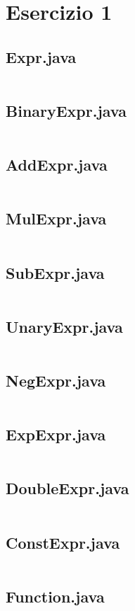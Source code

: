 \section*{Esercizio 1}

\subsection*{Expr.java}
\inputminted{java}{tex/src/1/Expr.java}

\subsection*{BinaryExpr.java}
\inputminted{java}{tex/src/1/BinaryExpr.java}

\subsection*{AddExpr.java}
\inputminted{java}{tex/src/1/AddExpr.java}

\subsection*{MulExpr.java}
\inputminted{java}{tex/src/1/MulExpr.java}

\subsection*{SubExpr.java}
\inputminted{java}{tex/src/1/SubExpr.java}

\subsection*{UnaryExpr.java}
\inputminted{java}{tex/src/1/UnaryExpr.java}

\subsection*{NegExpr.java}
\inputminted{java}{tex/src/1/NegExpr.java}

\subsection*{ExpExpr.java}
\inputminted{java}{tex/src/1/ExpExpr.java}

\subsection*{DoubleExpr.java}
\inputminted{java}{tex/src/1/DoubleExpr.java}

\subsection*{ConstExpr.java}
\inputminted{java}{tex/src/1/ConstExpr.java}

\subsection*{Function.java}
\inputminted{java}{tex/src/1/Function.java}
